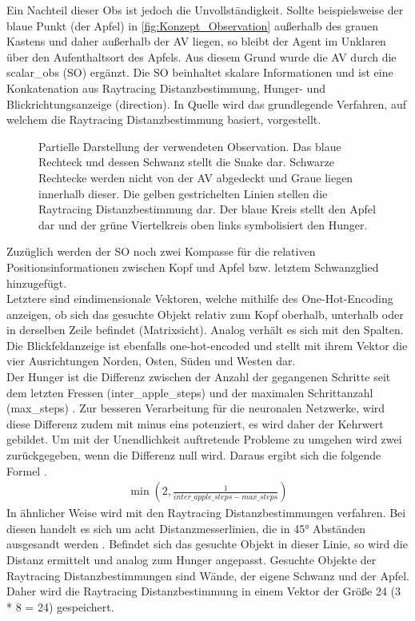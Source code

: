 Ein Nachteil dieser Obs ist jedoch die Unvollständigkeit. Sollte beispielsweise der blaue Punkt (der Apfel) in \autoref{fig:Konzept_Observation} außerhalb des grauen Kastens und daher außerhalb der AV liegen, so bleibt der Agent im Unklaren über den Aufenthaltsort des Apfels.
Aus diesem Grund wurde die AV durch die scalar\_obs (SO) ergänzt. Die SO beinhaltet skalare Informationen und ist eine Konkatenation aus Raytracing Distanzbestimmung, Hunger- und Blickrichtungsanzeige (direction).
In Quelle \citep{Glassner1989} wird das grundlegende Verfahren, auf welchem die Raytracing Distanzbestimmung basiert, vorgestellt. 
\begin{figure}[H]
	\centering
	
	\caption[Observation]{Partielle Darstellung der verwendeten Observation. Das blaue Rechteck und dessen Schwanz stellt die Snake dar. Schwarze Rechtecke werden nicht von der AV abgedeckt und Graue liegen innerhalb dieser. Die gelben gestrichelten Linien stellen die Raytracing Distanzbestimmung dar. Der blaue Kreis stellt den Apfel dar und der grüne Viertelkreis oben links symbolisiert den Hunger.}
	\label{fig:Konzept_Observation}
\end{figure}
Zuzüglich werden der SO noch zwei Kompasse für die relativen Positionsinformationen zwischen Kopf und Apfel bzw. letztem Schwanzglied hinzugefügt.\\
Letztere sind eindimensionale Vektoren, welche mithilfe des One-Hot-Encoding anzeigen, ob sich das gesuchte Objekt relativ zum Kopf oberhalb, unterhalb oder in derselben Zeile befindet (Matrixsicht). Analog verhält es sich mit den Spalten.\\
Die Blickfeldanzeige ist ebenfalls one-hot-encoded und stellt mit ihrem Vektor die vier Ausrichtungen Norden, Osten, Süden und Westen dar.\\
Der Hunger ist die Differenz zwischen der Anzahl der gegangenen Schritte seit dem letzten Fressen (inter\_apple\_steps) und der maximalen Schrittanzahl (max\_steps) . Zur besseren Verarbeitung für die neuronalen Netzwerke, wird diese Differenz zudem mit minus eins potenziert, es wird daher der Kehrwert gebildet. 
Um mit der Unendlichkeit auftretende Probleme zu umgehen wird zwei zurückgegeben, wenn die Differenz null wird.
Daraus ergibt sich die folgende Formel .
\begin{align}
	\min(2, \frac{1}{inter\_apple\_steps - max\_steps})
	\label{eq:Konzept_Hunger}
\end{align}
In ähnlicher Weise wird mit den Raytracing Distanzbestimmungen verfahren. Bei diesen handelt es sich um acht Distanzmesserlinien, die in 45° Abständen ausgesandt werden . Befindet sich das gesuchte Objekt in dieser Linie, so wird die Distanz ermittelt und analog zum Hunger angepasst. Gesuchte Objekte der Raytracing Distanzbestimmungen sind Wände, der eigene Schwanz und der Apfel. Daher wird die Raytracing Distanzbestimmung in einem Vektor der Größe 24 (3 * 8 = 24) gespeichert.

